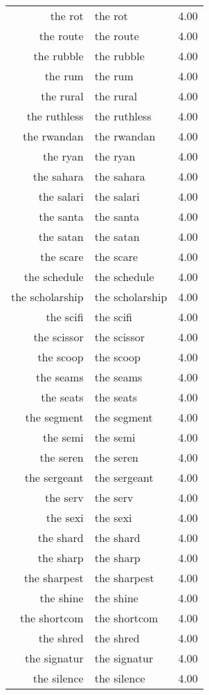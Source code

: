 \begin{table}[ht]
\begin{tabular}{rlr}
  the rot & the rot & 4.00 \\ 
  the route & the route & 4.00 \\ 
  the rubble & the rubble & 4.00 \\ 
  the rum & the rum & 4.00 \\ 
  the rural & the rural & 4.00 \\ 
  the ruthless & the ruthless & 4.00 \\ 
  the rwandan & the rwandan & 4.00 \\ 
  the ryan & the ryan & 4.00 \\ 
  the sahara & the sahara & 4.00 \\ 
  the salari & the salari & 4.00 \\ 
  the santa & the santa & 4.00 \\ 
  the satan & the satan & 4.00 \\ 
  the scare & the scare & 4.00 \\ 
  the schedule & the schedule & 4.00 \\ 
  the scholarship & the scholarship & 4.00 \\ 
  the scifi & the scifi & 4.00 \\ 
  the scissor & the scissor & 4.00 \\ 
  the scoop & the scoop & 4.00 \\ 
  the seams & the seams & 4.00 \\ 
  the seats & the seats & 4.00 \\ 
  the segment & the segment & 4.00 \\ 
  the semi & the semi & 4.00 \\ 
  the seren & the seren & 4.00 \\ 
  the sergeant & the sergeant & 4.00 \\ 
  the serv & the serv & 4.00 \\ 
  the sexi & the sexi & 4.00 \\ 
  the shard & the shard & 4.00 \\ 
  the sharp & the sharp & 4.00 \\ 
  the sharpest & the sharpest & 4.00 \\ 
  the shine & the shine & 4.00 \\ 
  the shortcom & the shortcom & 4.00 \\ 
  the shred & the shred & 4.00 \\ 
  the signatur & the signatur & 4.00 \\ 
  the silence & the silence & 4.00 \\ 

\end{tabular}
\end{table}
